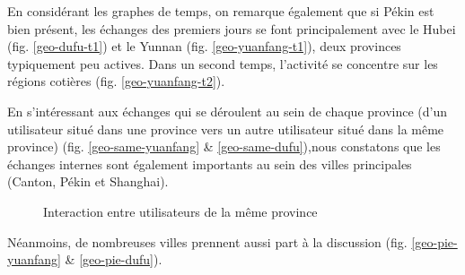 En consid\'erant les graphes de temps, on remarque \'egalement que si P\'ekin est bien pr\'esent, les \'echanges des premiers jours se font principalement avec le Hubei (fig. \ref{geo-dufu-t1}) et le Yunnan (fig. \ref{geo-yuanfang-t1}), deux provinces typiquement peu actives. Dans un second temps, l'activité se concentre sur les régions cotières (fig. \ref{geo-yuanfang-t2}).

En s{\textquoteright}int\'eressant aux \'echanges qui se d\'eroulent au sein de chaque province (d{\textquoteright}un utilisateur situ\'e dans une province vers un autre utilisateur situ\'e dans la m\^eme province) (fig. \ref{geo-same-yuanfang} \& \ref{geo-same-dufu}),nous constatons que les \'echanges internes sont \'egalement importants au sein des villes principales (Canton, P\'ekin et Shanghai).

\begin{figure}[h!]
    \centering
    \caption{
        Interaction entre utilisateurs de la m\^eme province
    }
\end{figure}

Néanmoins, de nombreuses villes prennent aussi part \`a la discussion (fig. \ref{geo-pie-yuanfang} \& \ref{geo-pie-dufu}). 


